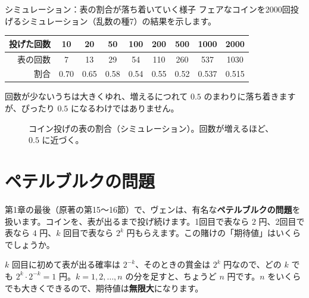 \documentclass[a4paper,11pt,openany]{ltjsbook}
\begin{document}
\begin{examplebox}{シミュレーション：表の割合が落ち着いていく様子}
フェアなコインを2000回投げるシミュレーション（乱数の種7）の結果を示します。
\begin{center}
\begin{tabular}{r|cccccccc}
\toprule
投げた回数 & 10 & 20 & 50 & 100 & 200 & 500 & 1000 & 2000\\
\midrule
表の回数 & 7 & 13 & 29 & 54 & 110 & 260 & 537 & 1030\\
割合 & 0.70 & 0.65 & 0.58 & 0.54 & 0.55 & 0.52 & 0.537 & 0.515\\
\bottomrule
\end{tabular}
\end{center}
回数が少ないうちは大きくゆれ、増えるにつれて $0.5$ のまわりに落ち着きますが、ぴったり $0.5$ になるわけではありません。
\end{examplebox}

\begin{figure}[htbp]
\centering
{}
\caption{コイン投げの表の割合（シミュレーション）。回数が増えるほど、$0.5$ に近づく。}
\end{figure}

\section{ペテルブルクの問題}

第1章の最後（原著の第15〜16節）で、ヴェンは、有名な\textbf{ペテルブルクの問題}を扱います。コインを、表が出るまで投げ続けます。1回目で表なら $2$ 円、2回目で表なら $4$ 円、$k$ 回目で表なら $2^k$ 円もらえます。この賭けの「期待値」はいくらでしょうか。

$k$ 回目に初めて表が出る確率は $2^{-k}$、そのときの賞金は $2^k$ 円なので、どの $k$ でも $2^k\cdot2^{-k}=1$ 円。$k=1,2,\ldots,n$ の分を足すと、ちょうど $n$ 円です。$n$ をいくらでも大きくできるので、期待値は\textbf{無限大}になります。
\end{document}
